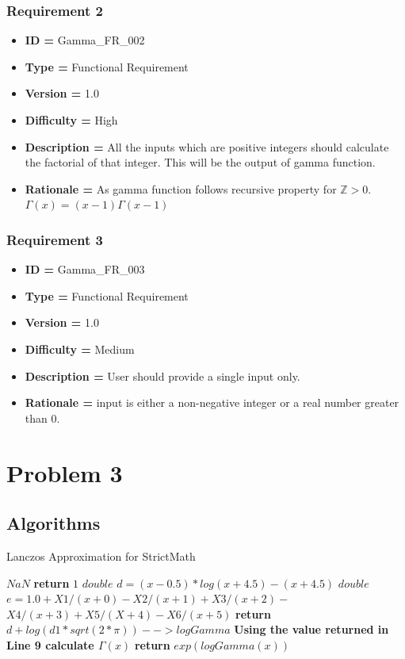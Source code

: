 \documentclass[12pt]{report}
\begin{document}
\subsubsection{Requirement 2}
\begin{itemize}
    \item \textbf{ID = }Gamma\_FR\_002
    \item \textbf{Type = }Functional Requirement
    \item \textbf{Version = } 1.0
    \item \textbf{Difficulty = }High
    \item \textbf{Description = } All the inputs which are positive integers should calculate the factorial of that integer. This will be the output of gamma function.
    \item \textbf{Rationale = }As gamma function follows recursive property for $\mathbb{Z}>0.$ $\Gamma(x)=(x-1)\Gamma(x-1)$
\end{itemize}

\subsubsection{Requirement 3}
\begin{itemize}
    \item \textbf{ID = }Gamma\_FR\_003
    \item \textbf{Type = }Functional Requirement
    \item \textbf{Version = } 1.0
    \item \textbf{Difficulty = }Medium
    \item \textbf{Description = } User should provide a single input only.
    \item \textbf{Rationale = }input is either a non-negative integer or a real number greater than 0.
\end{itemize}

\newpage
\section{Problem 3}
\subsection{Algorithms}
\begin{algorithm}
\caption{Lanczos Approximation for StrictMath}
\begin{algorithmic}[1]
\State $NaN$
\EndIf
{}
\State \textbf{return} $1$
\EndIf
{}
\State $double$ $d = (x-0.5) * log(x+4.5) - (x+4.5)$
\State $double$ $e = 1.0 + X1/(x+0) - X2/(x+1) + X3/(x+2) - $
\State $X4/(x+3) + X5/(X+4) - X6/(x+5)$
\State \textbf{return} $d + log(d1 * sqrt(2*\pi)) --> logGamma$
\EndIf
\State \textbf{Using the value returned in Line 9 calculate $\Gamma(x)$}
\State \textbf{return} $exp(logGamma(x))$

\end{algorithmic}
\end{algorithm}
\end{document}

